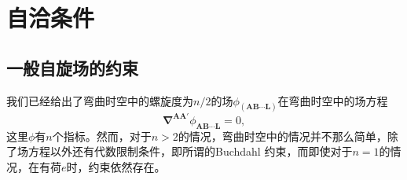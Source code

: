 \section{自洽条件}
\subsection{一般自旋场的约束}

我们已经给出了弯曲时空中的螺旋度为$n/2$的场$\phi _{(\boldsymbol{AB} \cdots \boldsymbol{L})}$在弯曲时空中的场方程
\begin{equation}
	\mathbf{\nabla }^{\boldsymbol{AA} '} \phi _{\boldsymbol{AB} \cdots \boldsymbol{L}} =0,
	\label{eq:7.16}
\end{equation}
这里$\phi $有$n$个指标。然而，对于$n >2$的情况，弯曲时空中的情况并不那么简单，除了场方程以外还有代数限制条件，即所谓的Buchdahl 约束\parencite{buchdahl_compatibility_1958}，而即使对于$n=1$的情况，在有荷$e$时，约束依然存在。



